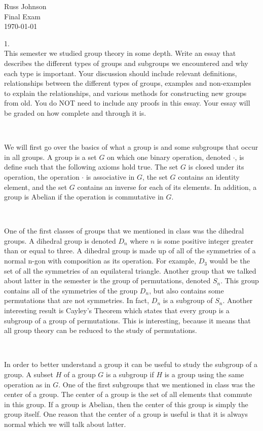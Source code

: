 \documentclass[11pt]{article}
\begin{document}
\begin{flushright}
Russ Johnson\\
Final Exam\\
\today\\
\end{flushright}

1.\\
This semester we studied group theory in some depth. Write an essay that describes the different types of groups and subgroups we encountered and why each type is important. Your discussion should include relevant definitions, relationships between the different types of groups, examples and non-examples to explain the relationships, and various methods for constructing new groups from old. You do NOT need to include any proofs in this essay. Your essay will be graded on how complete and through it is.

~

We will first go over the basics of what a group is and some subgroups that occur in all groups. A group is a set $G$ on which one binary operation, denoted $\cdot$, is define such that the following axioms hold true. The set $G$ is closed under its operation, the operation $\cdot$ is associative in $G$, the set $G$ contains an identity element, and the set $G$ contains an inverse for each of its elements. In addition, a group is Abelian if the operation is commutative in $G$. 

~

One of the first classes of groups that we mentioned in class was the dihedral groups. A dihedral group is denoted $D_n$ where $n$ is some positive integer greater than or equal to three. A dihedral group is made up of all of the symmetries of a normal n-gon with composition as its operation. For example, $D_3$ would be the set of all the symmetries of an equilateral triangle. Another group that we talked about latter in the semester is the group of permutations, denoted $S_n$. This group contains all of the symmetries of the group $D_n$, but also contains some permutations that are not symmetries. In fact, $D_n$ is a subgroup of $S_n$. Another interesting result is Cayley's Theorem which states that every group is a subgroup of a group of permutations. This is interesting, because it means that all group theory can be reduced to the study of permutations.

~

In order to better understand a group it can be useful to study the subgroup of a group. A subset $H$ of a group $G$ is a subgroup if $H$ is a group using the same operation as in $G$. One of the first subgroups that we mentioned in class was the center of a group. The center of a group is the set of all elements that commute in this group. If a group is Abelian, then the center of this group is simply the group itself. One reason that the center of a group is useful is that it is always normal which we will talk about latter.
\end{document}

